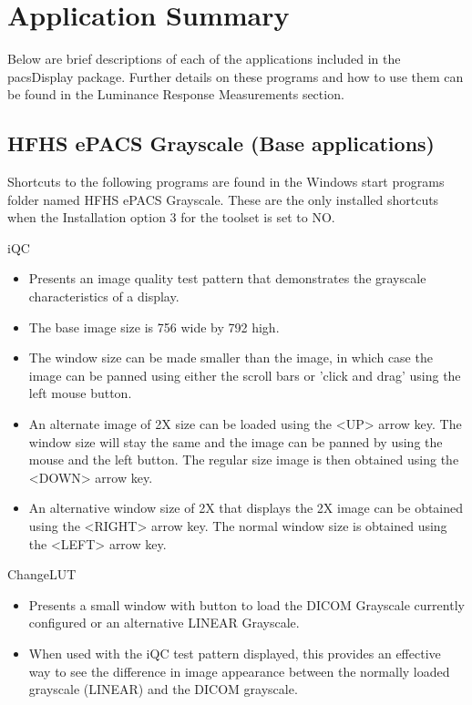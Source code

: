 %

\section{Application Summary}
\label{sec:appsummary}

Below are brief descriptions of each of the applications included in the pacsDisplay package. Further details on these programs and how to use them can be found in the Luminance Response Measurements section. 

\subsection{HFHS ePACS Grayscale (Base applications)}
\label{sec:baseapps}

Shortcuts to the following programs are found in the Windows start programs folder named \textnormal{HFHS ePACS Grayscale}. These are the only installed shortcuts when the Installation option 3 for the toolset is set to NO. 

iQC
\begin{itemize}
\item Presents an image quality test pattern that demonstrates the grayscale characteristics of a display. 
\item The base image size is 756 wide by 792 high. 
\item The window size can be made smaller than the image, in which case the image can be panned using either the scroll bars or 'click and drag' using the left mouse button. 
\item An alternate image of 2X size can be loaded using the <UP> arrow key. The window size will stay the same and the image can be panned by using the mouse and the left button. The regular size image is then obtained using the <DOWN> arrow key. 
\item An alternative window size of 2X that displays the 2X image can be obtained using the <RIGHT> arrow key. The normal window size is obtained using the <LEFT> arrow key.
\end{itemize} 

ChangeLUT
\begin{itemize}
\item Presents a small window with button to load the DICOM Grayscale currently configured or an alternative LINEAR Grayscale. 
\item When used with the iQC test pattern displayed, this provides an effective way to see the difference in image appearance between the normally loaded grayscale (LINEAR) and the DICOM grayscale. 
\end{itemize}

